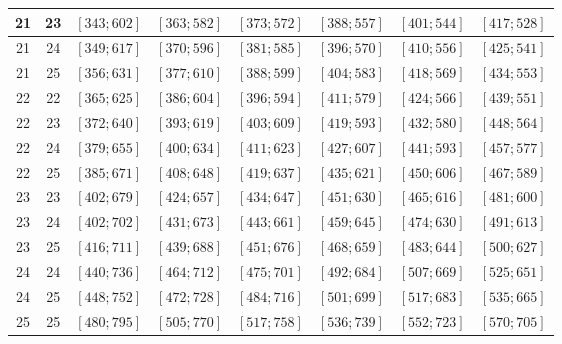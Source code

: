 \documentclass[a4paper,12pt]{article}
\begin{document}
\begin{center}
{\begin{longtable}[H]{|c|c|c|c|c|c|c|c|}
21 &  23 &  $\left[ 343; 602\right]$ &  $\left[ 363; 582\right]$ &  $\left[ 373; 572\right]$ &  $\left[ 388; 557\right]$ &  $\left[ 401; 544\right]$ &  $\left[ 417; 528\right]$ \tabularnewline \hline
21 &  24 &  $\left[ 349; 617\right]$ &  $\left[ 370; 596\right]$ &  $\left[ 381; 585\right]$ &  $\left[ 396; 570\right]$ &  $\left[ 410; 556\right]$ &  $\left[ 425; 541\right]$ \tabularnewline \hline
21 &  25 &  $\left[ 356; 631\right]$ &  $\left[ 377; 610\right]$ &  $\left[ 388; 599\right]$ &  $\left[ 404; 583\right]$ &  $\left[ 418; 569\right]$ &  $\left[ 434; 553\right]$ \tabularnewline \hline
22 &  22 &  $\left[ 365; 625\right]$ &  $\left[ 386; 604\right]$ &  $\left[ 396; 594\right]$ &  $\left[ 411; 579\right]$ &  $\left[ 424; 566\right]$ &  $\left[ 439; 551\right]$ \tabularnewline \hline
22 &  23 &  $\left[ 372; 640\right]$ &  $\left[ 393; 619\right]$ &  $\left[ 403; 609\right]$ &  $\left[ 419; 593\right]$ &  $\left[ 432; 580\right]$ &  $\left[ 448; 564\right]$ \tabularnewline \hline
22 &  24 &  $\left[ 379; 655\right]$ &  $\left[ 400; 634\right]$ &  $\left[ 411; 623\right]$ &  $\left[ 427; 607\right]$ &  $\left[ 441; 593\right]$ &  $\left[ 457; 577\right]$ \tabularnewline \hline
22 &  25 &  $\left[ 385; 671\right]$ &  $\left[ 408; 648\right]$ &  $\left[ 419; 637\right]$ &  $\left[ 435; 621\right]$ &  $\left[ 450; 606\right]$ &  $\left[ 467; 589\right]$ \tabularnewline \hline
23 &  23 &  $\left[ 402; 679\right]$ &  $\left[ 424; 657\right]$ &  $\left[ 434; 647\right]$ &  $\left[ 451; 630\right]$ &  $\left[ 465; 616\right]$ &  $\left[ 481; 600\right]$ \tabularnewline \hline
23 &  24 &  $\left[ 402; 702\right]$ &  $\left[ 431; 673\right]$ &  $\left[ 443; 661\right]$ &  $\left[ 459; 645\right]$ &  $\left[ 474; 630\right]$ &  $\left[ 491; 613\right]$ \tabularnewline \hline
23 &  25 &  $\left[ 416; 711\right]$ &  $\left[ 439; 688\right]$ &  $\left[ 451; 676\right]$ &  $\left[ 468; 659\right]$ &  $\left[ 483; 644\right]$ &  $\left[ 500; 627\right]$ \tabularnewline \hline
24 &  24 &  $\left[ 440; 736\right]$ &  $\left[ 464; 712\right]$ &  $\left[ 475; 701\right]$ &  $\left[ 492; 684\right]$ &  $\left[ 507; 669\right]$ &  $\left[ 525; 651\right]$ \tabularnewline \hline
24 &  25 &  $\left[ 448; 752\right]$ &  $\left[ 472; 728\right]$ &  $\left[ 484; 716\right]$ &  $\left[ 501; 699\right]$ &  $\left[ 517; 683\right]$ &  $\left[ 535; 665\right]$ \tabularnewline \hline
25 &  25 &  $\left[ 480; 795\right]$ &  $\left[ 505; 770\right]$ &  $\left[ 517; 758\right]$ &  $\left[ 536; 739\right]$ &  $\left[ 552; 723\right]$ &  $\left[ 570; 705\right]$ \tabularnewline \hline
\end{longtable}
}
\end{center}

\newpage
\end{document}

